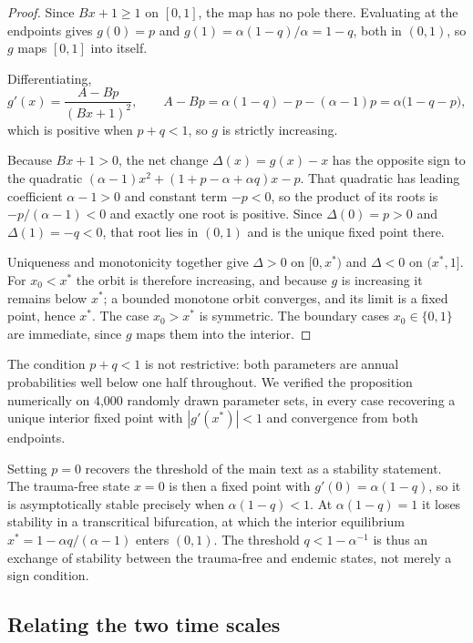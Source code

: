 \documentclass{article}
\begin{document}
\begin{proof}
Since \(Bx+1\ge 1\) on \([0,1]\), the map has no pole there.  Evaluating at the
endpoints gives \(g(0)=p\) and \(g(1)=\alpha(1-q)/\alpha=1-q\), both in
\((0,1)\), so \(g\) maps \([0,1]\) into itself.

Differentiating,
\[
    g'(x)=\frac{A-Bp}{(Bx+1)^2},
    \qquad
    A-Bp=\alpha(1-q)-p-(\alpha-1)p=\alpha\bigl(1-q-p\bigr),
\]
which is positive when \(p+q<1\), so \(g\) is strictly increasing.

Because \(Bx+1>0\), the net change \(\Delta(x)=g(x)-x\) has the opposite sign to
the quadratic \((\alpha-1)x^2+(1+p-\alpha+\alpha q)x-p\).  That quadratic has
leading coefficient \(\alpha-1>0\) and constant term \(-p<0\), so the product of
its roots is \(-p/(\alpha-1)<0\) and exactly one root is positive.  Since
\(\Delta(0)=p>0\) and \(\Delta(1)=-q<0\), that root lies in \((0,1)\) and is the
unique fixed point there.

Uniqueness and monotonicity together give \(\Delta>0\) on \([0,x^*)\) and
\(\Delta<0\) on \((x^*,1]\).  For \(x_0<x^*\) the orbit is therefore increasing,
and because \(g\) is increasing it remains below \(x^*\); a bounded monotone
orbit converges, and its limit is a fixed point, hence \(x^*\).  The case
\(x_0>x^*\) is symmetric.  The boundary cases \(x_0\in\{0,1\}\) are immediate,
since \(g\) maps them into the interior.
\end{proof}

The condition \(p+q<1\) is not restrictive: both parameters are annual
probabilities well below one half throughout.  We verified the proposition
numerically on 4{,}000 randomly drawn parameter sets, in every case recovering a
unique interior fixed point with \(|g'(x^*)|<1\) and convergence from both
endpoints.

Setting \(p=0\) recovers the threshold of the main text as a stability
statement.  The trauma-free state \(x=0\) is then a fixed point with
\(g'(0)=\alpha(1-q)\), so it is asymptotically stable precisely when
\(\alpha(1-q)<1\).  At \(\alpha(1-q)=1\) it loses stability in a transcritical
bifurcation, at which the interior equilibrium
\(x^*=1-\alpha q/(\alpha-1)\) enters \((0,1)\).  The threshold
\(q<1-\alpha^{-1}\) is thus an exchange of stability between the trauma-free and
endemic states, not merely a sign condition.

\subsection{Relating the two time scales}
\label{si:timescales}
\end{document}
